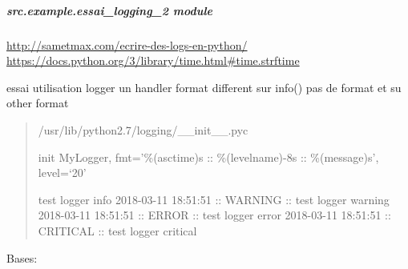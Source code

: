 \documentclass[a4paper,10pt,english]{sphinxmanual}
\begin{document}
\begin{fulllineitems}
\label{commands/apidoc/src.example:src.example.essai_logging_1.getMyLogger}
\end{fulllineitems}


\begin{fulllineitems}
\label{commands/apidoc/src.example:src.example.essai_logging_1.initMyLogger}
\end{fulllineitems}


\begin{fulllineitems}
\label{commands/apidoc/src.example:src.example.essai_logging_1.testLogger1}
\end{fulllineitems}



\subparagraph{src.example.essai\_logging\_2 module}
\label{commands/apidoc/src.example:module-src.example.essai_logging_2}\label{commands/apidoc/src.example:src-example-essai-logging-2-module}
\url{http://sametmax.com/ecrire-des-logs-en-python/}
\url{https://docs.python.org/3/library/time.html\#time.strftime}

essai utilisation logger un handler format different 
sur info() pas de format et su other format
\begin{quote}

/usr/lib/python2.7/logging/\_\_init\_\_.pyc

init MyLogger, fmt='\%(asctime)s :: \%(levelname)-8s :: \%(message)s', level=`20'

test logger info
2018-03-11 18:51:51 :: WARNING  :: test logger warning
2018-03-11 18:51:51 :: ERROR    :: test logger error
2018-03-11 18:51:51 :: CRITICAL :: test logger critical
\end{quote}

\begin{fulllineitems}
\label{commands/apidoc/src.example:src.example.essai_logging_2.MyFormatter}
Bases: 

\begin{fulllineitems}
\label{commands/apidoc/src.example:src.example.essai_logging_2.MyFormatter.format}
\end{fulllineitems}


\end{fulllineitems}
\end{document}
